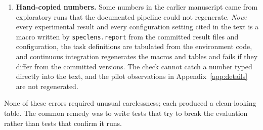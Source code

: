 \begin{enumerate}[leftmargin=*,itemsep=2pt]
\item \textbf{Hand-copied numbers.} Some numbers in the earlier manuscript came
from exploratory runs that the documented pipeline could not regenerate.
\emph{Now:} every experimental result and every configuration setting cited
in the text is a macro written by \texttt{speclens.report} from the committed
result files and configuration, the task definitions are tabulated from the
environment code, and continuous integration regenerates the macros and tables
and fails if they differ from the committed versions. The check cannot catch a
number typed directly into the text, and the pilot observations in
Appendix~\ref{app:details} are not regenerated.
\end{enumerate}

None of these errors required unusual carelessness; each produced a clean-looking
 table. The common remedy was to write tests that try to break the
evaluation rather than tests that confirm it runs.
